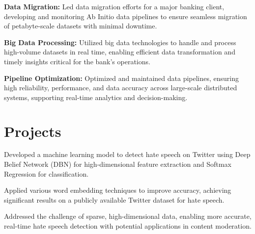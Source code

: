 \documentclass[]{deedy-resume-reversed}
\begin{document}
\begin{minipage}[t]{0.60\textwidth}
\begin{tightemize}
\item \textbf{Data Migration:} Led data migration efforts 
    for a major banking client, developing and monitoring Ab Initio data pipelines to ensure seamless migration of petabyte-scale datasets with minimal downtime.
  \item \textbf{Big Data Processing:} Utilized big data technologies 
    to handle and process high-volume datasets in real time, enabling efficient data transformation and timely insights critical for the bank’s operations.
  \item \textbf{Pipeline Optimization:} Optimized and maintained data pipelines, 
    ensuring high reliability, performance, and data accuracy across large-scale distributed systems, supporting real-time analytics and decision-making.
\end{tightemize}
\sectionsep



\section{Projects}
\begin{tightemize}
  \item Developed a machine learning model to detect hate speech on Twitter using Deep Belief Network (DBN) for high-dimensional feature extraction and Softmax Regression for classification.
  \item Applied various word embedding techniques to improve accuracy, achieving significant results on a publicly available Twitter dataset for hate speech.
  \item Addressed the challenge of sparse, high-dimensional data, enabling more accurate, real-time hate speech detection with potential applications in content moderation.
\end{tightemize}
\sectionsep



\end{minipage}
\end{document}
